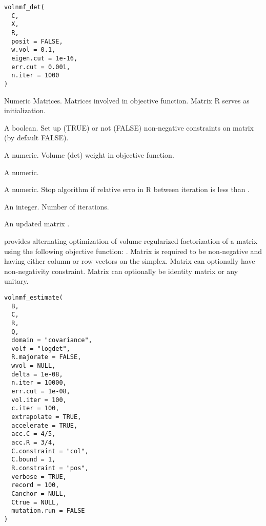 \documentclass[letterpaper]{book}
\begin{document}
%
\begin{Usage}
\begin{verbatim}
volnmf_det(
  C,
  X,
  R,
  posit = FALSE,
  w.vol = 0.1,
  eigen.cut = 1e-16,
  err.cut = 0.001,
  n.iter = 1000
)
\end{verbatim}
\end{Usage}
%
\begin{Arguments}
\begin{ldescription}
\item[\code{C, X, R}] Numeric Matrices. Matrices involved in objective function.
Matrix R serves as initialization.

\item[\code{posit}] A boolean. Set up (TRUE) or not (FALSE) non-negative constraints on matrix  (by default FALSE).

\item[\code{w.vol}] A numeric. Volume (det) weight in objective function.

\item[\code{eigen.cut}] A numeric.

\item[\code{err.cut}] A numeric. Stop algorithm if relative erro in R between iteration is less than .

\item[\code{n.iter}] An integer. Number of iterations.
\end{ldescription}
\end{Arguments}
%
\begin{Value}
An updated matrix .
\end{Value}
%
\begin{Description}\relax
{} provides alternating optimization of volume-regularized factorization of a matrix  using the following objective function:
. Matrix  is required to be non-negative and having either column or row vectors on the simplex.
Matrix  can optionally have non-negativity constraint. Matrix  can optionally be identity matrix or any unitary.
\end{Description}
%
\begin{Usage}
\begin{verbatim}
volnmf_estimate(
  B,
  C,
  R,
  Q,
  domain = "covariance",
  volf = "logdet",
  R.majorate = FALSE,
  wvol = NULL,
  delta = 1e-08,
  n.iter = 10000,
  err.cut = 1e-08,
  vol.iter = 100,
  c.iter = 100,
  extrapolate = TRUE,
  accelerate = TRUE,
  acc.C = 4/5,
  acc.R = 3/4,
  C.constraint = "col",
  C.bound = 1,
  R.constraint = "pos",
  verbose = TRUE,
  record = 100,
  Canchor = NULL,
  Ctrue = NULL,
  mutation.run = FALSE
)
\end{verbatim}
\end{Usage}
\end{document}
